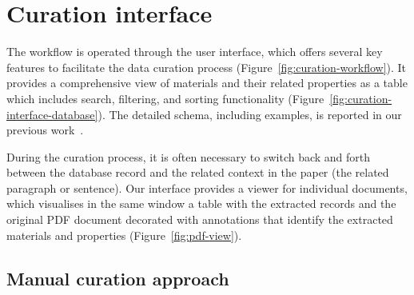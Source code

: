 \documentclass[]{interact}
\theoremstyle{plain} %
\theoremstyle{definition}
\theoremstyle{remark}
\begin{document}
\section{Curation interface}
\label{sec:user-interface}

The workflow is operated through the user interface, which offers several key features to facilitate the data curation process (Figure~\ref{fig:curation-workflow}).
It provides a comprehensive view of materials and their related properties as a table which includes search, filtering, and sorting functionality (Figure~\ref{fig:curation-interface-database}). 
The detailed schema, including examples, is reported in our previous work~\cite{lfoppiano2023automatic}.

During the curation process, it is often necessary to switch back and forth between the database record and the related context in the paper (the related paragraph or sentence). 
Our interface provides a viewer for individual documents, which visualises in the same window a table with the extracted records and the original PDF document decorated with annotations that identify the extracted materials and properties (Figure~\ref{fig:pdf-view}). 






\subsection{Manual curation approach}
\label{sec:data-correction}
\label{subsec:manual_correction}
\end{document}
